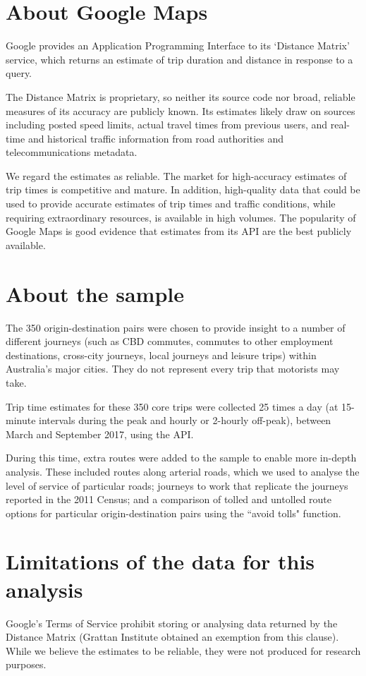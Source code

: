 \documentclass{grattan}
\begin{document}
\section{About Google Maps}
Google provides an Application Programming Interface to its `Distance Matrix' service, which returns an estimate of trip duration and distance in response to a query.

The Distance Matrix is proprietary, so neither its source code nor broad, reliable measures of its accuracy are publicly known.
Its estimates likely draw on sources including posted speed limits, actual travel times from previous users, and real-time and historical traffic information from road authorities and telecommunications metadata.

We regard the estimates as reliable.
The market for high-accuracy estimates of trip times is competitive and mature.
In addition, high-quality data that could be used to provide accurate estimates of trip times and traffic conditions, while requiring extraordinary resources, is available in high volumes.
The popularity of Google Maps is good evidence that estimates from its API are the best publicly available.

\section{About the sample}

The 350 origin-destination pairs were chosen to provide insight to a number of different journeys (such as CBD commutes, commutes to other employment destinations, cross-city journeys, local journeys and leisure trips) within Australia's major cities.
They do not represent every trip that motorists may take.

Trip time estimates for these 350 core trips were collected 25 times a day (at 15-minute intervals during the peak and hourly or 2-hourly off-peak),
 between March and September 2017, using the API.

During this time, extra routes were added to the sample to enable more in-depth analysis.
These included routes along arterial roads, which we used to analyse the level of service of particular roads; journeys to work that replicate the journeys reported in the 2011 Census; and a comparison of tolled and untolled route options for particular origin-destination pairs using the ``avoid tolls" function.

\section{Limitations of the data for this analysis}
Google's Terms of Service prohibit storing or analysing data returned by the Distance Matrix (Grattan Institute obtained an exemption from this clause).
While we believe the estimates to be reliable, they were not produced for research purposes.
\end{document}
